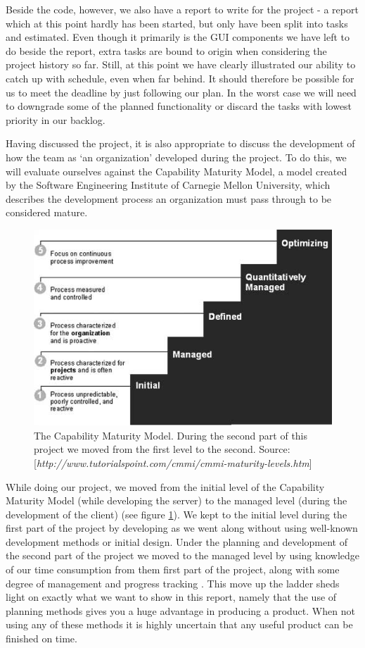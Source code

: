 Beside the code, however, we also have a report to write for the project - a report which at this point hardly has been started, but only have been split into tasks and estimated.
Even though it primarily is the GUI components we have left to do beside the report, extra tasks are bound to origin when considering the project history so far. Still, at this point we have clearly illustrated our ability to catch up with schedule, even when far behind.
It should therefore be possible for us to meet the deadline by just following our plan. In the worst case we will need to downgrade some of the planned functionality or discard the tasks with lowest priority in our backlog.

Having discussed the project, it is also appropriate to discuss the development of how the team as `an organization' developed during the project. To do this, we will evaluate ourselves against the Capability Maturity Model, a model created by the Software Engineering Institute of Carnegie Mellon University, which describes the development process an organization must pass through to be considered mature.

\begin{figure}[t]
  \includegraphics[width=\textwidth]{illustrations/CMM.jpg}
  \caption{The Capability Maturity Model. During the second part of this project we moved from the first level to the second. Source: [\textit{http://www.tutorialspoint.com/cmmi/cmmi-maturity-levels.htm}]}
  \label{fig:Capability_Maturity_Model}
\end{figure}

While doing our project, we moved from the initial level of the Capability Maturity Model (while developing the server) to the managed level (during the development of the client) (see figure \ref{fig:Capability_Maturity_Model}). We kept to the initial level during the first part of the project by developing as we went along without using well-known development methods or initial design. Under the planning and development of the second part of the project we moved to the managed level by using knowledge of our time consumption from them first part of the project, along with some degree of management and progress tracking \cite[p. 242]{PM}. This move up the ladder sheds light on exactly what we want to show in this report, namely that the use of planning methods gives you a huge advantage in producing a product. When not using any of these methods it is highly uncertain that any useful product can be finished on time.